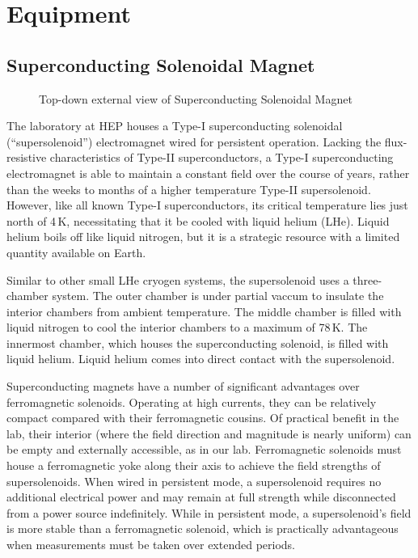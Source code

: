 \part{Equipment}

\chapter{Superconducting Solenoidal Magnet}
\label{chap:eq_magnet}

\begin{figure}[htbp]
  \centering
  
  \caption{Top-down external view of Superconducting Solenoidal Magnet}
  \label{fig:eq_magnet:topdown}
\end{figure}



The laboratory at HEP houses a Type-I superconducting solenoidal (``supersolenoid'') electromagnet wired for persistent operation.  Lacking the flux-resistive characteristics of Type-II superconductors, a Type-I superconducting electromagnet is able to maintain a constant field over the course of years, rather than the weeks to months of a higher temperature Type-II supersolenoid.  However, like all known Type-I superconductors, its critical temperature lies just north of 4\,K, necessitating that it be cooled with liquid helium (LHe).  Liquid helium boils off like liquid nitrogen, but it is a strategic resource with a limited quantity available on Earth.

Similar to other small LHe cryogen systems, the supersolenoid uses a three-chamber system.  The outer chamber is under partial vaccum to insulate the interior chambers from ambient temperature.  The middle chamber is filled with liquid nitrogen to cool the interior chambers to a maximum of 78\,K.  The innermost chamber, which houses the superconducting solenoid, is filled with liquid helium.  Liquid helium comes into direct contact with the supersolenoid.

Superconducting magnets have a number of significant advantages over ferromagnetic solenoids.  Operating at high currents, they can be relatively compact compared with their ferromagnetic cousins.  Of practical benefit in the lab, their interior (where the field direction and magnitude is nearly uniform) can be empty and externally accessible, as in our lab.  Ferromagnetic solenoids must house a ferromagnetic yoke along their axis to achieve the field strengths of supersolenoids.  When wired in persistent mode, a supersolenoid requires no additional electrical power and may remain at full strength while disconnected from a power source indefinitely.  While in persistent mode, a supersolenoid's field is more stable than a ferromagnetic solenoid, which is practically advantageous when measurements must be taken over extended periods.

